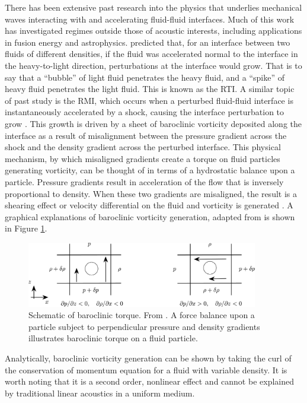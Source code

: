 There has been extensive past research into the physics that underlies
mechanical waves interacting with and accelerating fluid-fluid
interfaces. Much of this work has investigated regimes outside those
of acoustic interests, including applications in fusion energy and
astrophysics. \cite{Taylor1950} predicted that, for an interface
between two fluids of different densities, if the fluid was
accelerated normal to the interface in the heavy-to-light direction,
perturbations at the interface would grow. That is to say that a
``bubble'' of light fluid penetrates the heavy fluid, and a ``spike''
of heavy fluid penetrates the light fluid. This is known as the
\ac{RTI}. A similar topic of past study is the \ac{RMI}, which occurs
when a perturbed fluid-fluid interface is instantaneously accelerated
by a shock, causing the interface perturbation to grow
\citep{Brouillette2002,Drake2006}. This growth is driven by a sheet of
baroclinic vorticity deposited along the interface as a result of
misalignment between the pressure gradient across the shock and the
density gradient across the perturbed interface. This physical
mechanism, by which misaligned gradients create a torque on fluid
particles generating vorticity, can be thought of in terms of a
hydrostatic balance upon a particle. Pressure gradients result in
acceleration of the flow that is inversely proportional to
density. When these two gradients are misaligned, the result is a
shearing effect or velocity differential on the fluid and vorticity is
generated \citep{Heifetz2015}. A graphical explanations of baroclinic
vorticity generation, adapted from \citep{Heifetz2015} is shown in
Figure \ref{fig:usbe_lung_baroclinic_schematic}.
\begin{figure}
  \centering
  \includegraphics[width=0.9\textwidth]{./figs/intro_figs/baroclinic_schematic} \hfill
  \caption[Schematic of baroclinic torque]{Schematic of baroclinic
    torque. From \cite{Heifetz2015}. A force balance upon
    a particle subject to perpendicular pressure and density gradients
    illustrates baroclinic torque on a fluid particle.}
  \label{fig:usbe_lung_baroclinic_schematic}
\end{figure}
Analytically, baroclinic vorticity generation can be shown by taking
the curl of the conservation of momentum equation for a fluid with
variable density. It is worth noting that it is a second order,
nonlinear effect and cannot be explained by traditional linear
acoustics in a uniform medium.


